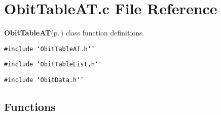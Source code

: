 \section{Obit\-Table\-AT.c File Reference}
\label{ObitTableAT_8c}
{\bf Obit\-Table\-AT}{\rm (p.\,\pageref{structObitTableAT})} class function definitions. 

{\tt \#include \char`\"{}Obit\-Table\-AT.h\char`\"{}}\par
{\tt \#include \char`\"{}Obit\-Table\-List.h\char`\"{}}\par
{\tt \#include \char`\"{}Obit\-Data.h\char`\"{}}\par
\subsection*{Functions}

